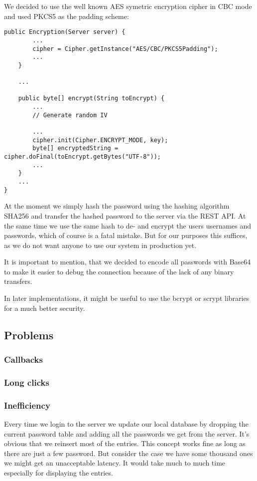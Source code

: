\documentclass{report}
\begin{document}
We decided to use the well known AES symetric encryption cipher in CBC mode and used PKCS5 as the padding scheme:

\begin{lstlisting}
public Encryption(Server server) {
        ...
        cipher = Cipher.getInstance("AES/CBC/PKCS5Padding");
        ...
    }
    
    ...
    
    public byte[] encrypt(String toEncrypt) {
        ...
        // Generate random IV
        
		...        
        cipher.init(Cipher.ENCRYPT_MODE, key);
        byte[] encryptedString = cipher.doFinal(toEncrypt.getBytes("UTF-8"));
        ...
    }
    ...
}
\end{lstlisting}

At the moment we simply hash the password using the hashing algorithm SHA256 and transfer the hashed password to the server via the REST API. At the same time we use the same hash to de- and encrypt the users usernames and passwords, which of course is a fatal mistake. But for our purposes this suffices, as we do not want anyone to use our system in production yet.

It is important to mention, that we decided to encode all passwords with Base64 to make it easier to debug the connection because of the lack of any binary transfers.

In later implementations, it might be useful to use the bcrypt or scrypt libraries for a much better security. 

\subsection{Problems}



\subsubsection{Callbacks}


\subsubsection{Long clicks}


\subsubsection{Inefficiency}
Every time we login to the server we update our local database by 
dropping the current password table and adding all the passwords we get from the server. It's obvious that we reinsert most of the entries. This concept works fine as long as there are just a few password. But consider the case we have some thousand ones we might get an unacceptable latency. It would take much to much time especially for displaying the entries. 
\end{document}

